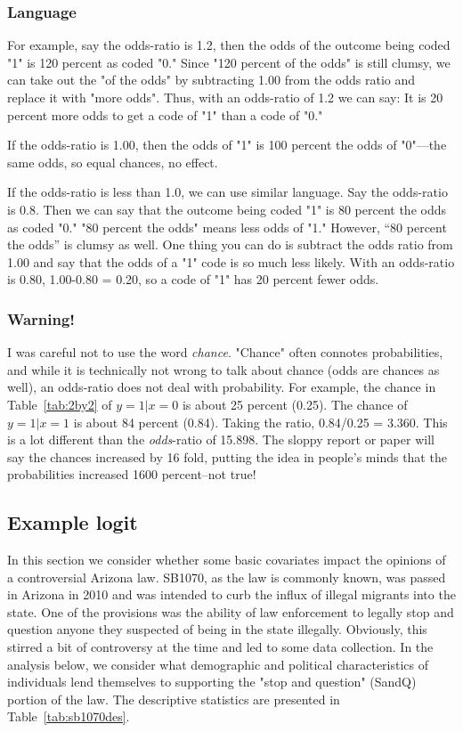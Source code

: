 \subsubsection{Language}

For example, say the odds-ratio is 1.2, then the odds of the outcome being coded "1" is 120 percent as coded "0." Since "120 percent of the odds" is still clumsy, we can take out the "of the odds" by subtracting 1.00 from the odds ratio and replace it with "more odds". Thus, with an odds-ratio of 1.2 we can say: It is 20 percent more odds to get a code of "1" than a code of "0."

If the odds-ratio is 1.00, then the odds of "1" is 100 percent the odds of "0"—the same odds, so equal chances, no effect.

If the odds-ratio is less than 1.0, we can use similar language. Say the odds-ratio is 0.8. Then we can say that the outcome being coded "1" is 80 percent the odds as coded "0." "80 percent the odds" means less odds of "1."  However, “80 percent the odds” is clumsy as well. One thing you can do is subtract the odds ratio from 1.00 and say that the odds of a "1" code is so much less likely. With an odds-ratio is 0.80, 1.00-0.80 = 0.20, so a code of "1" has 20 percent fewer odds.

\subsubsection{Warning!}

I was careful not to use the word {\it chance}. "Chance" often connotes probabilities, and while it is technically not wrong to talk about chance (odds are chances as well), an odds-ratio does not deal with probability. For example, the chance in Table~\ref{tab:2by2} of $y=1|x=0$ is about 25 percent (0.25). The chance of $y=1|x=1$ is about 84 percent (0.84). Taking the ratio, 0.84/0.25 = 3.360. This is a lot different than the {\it odds}-ratio of 15.898. The sloppy report or paper will say the chances increased by 16 fold, putting the idea in people's minds that the probabilities increased 1600 percent--not true!

\subsection{Example logit}

In this section we consider whether some basic covariates impact the opinions of a controversial Arizona law.  SB1070, as the law is commonly known, was passed in Arizona in 2010 and was intended to curb the influx of illegal migrants into the state. One of the provisions was the ability of law enforcement to legally stop and question anyone they suspected of being in the state illegally. Obviously, this stirred a bit of controversy at the time and led to some data collection.  In the analysis below, we consider what demographic and political characteristics of individuals lend themselves to supporting the "stop and question" (SandQ) portion of the law. The descriptive statistics are presented in Table~\ref{tab:sb1070des}.

